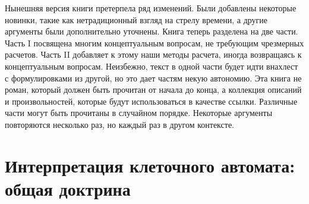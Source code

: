 \documentclass[aps,%
12pt,%
final,%
oneside,
onecolumn,%
musixtex, %
superscriptaddress,%
centertags]{article} %
\begin{document}
Нынешняя версия книги претерпела ряд изменений. Были добавлены некоторые новинки, такие как нетрадиционный взгляд на стрелу времени, а другие аргументы были дополнительно уточнены. Книга теперь разделена на две части. Часть I посвящена многим концептуальным вопросам, не требующим чрезмерных расчетов. Часть II добавляет к этому наши методы расчета, иногда возвращаясь к концептуальным вопросам. Неизбежно, текст в одной части будет идти внахлест с формулировками из другой, но это дает частям некую автономию. Эта книга не роман, который должен быть прочитан от начала до конца, а коллекция описаний и произвольностей, которые будут использоваться в качестве ссылки. Различные части могут быть прочитаны в случайном порядке. Некоторые аргументы повторяются несколько раз, но каждый раз в другом контексте.

\newpage
\tableofcontents
\newpage

\part{Интерпретация клеточного автомата: общая доктрина}
\openxs 
\openxs
\end{document}

